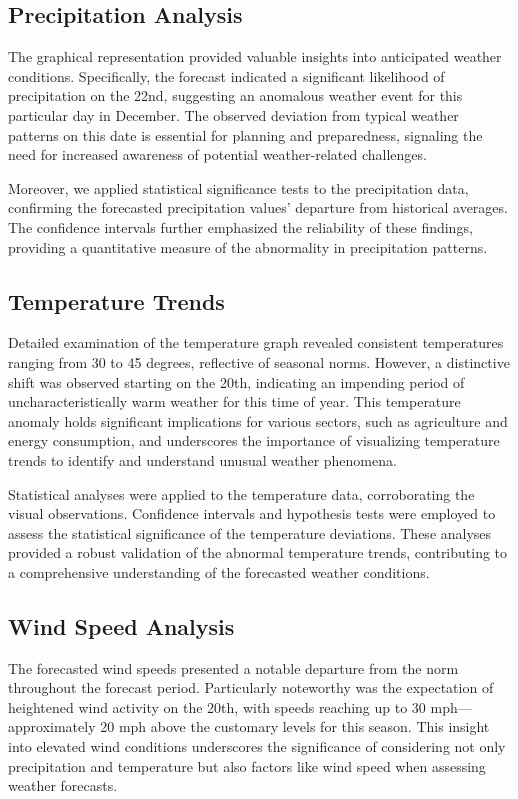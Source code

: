 \documentclass[conference]{IEEEtran}
\begin{document}
\subsection{Precipitation Analysis}

    The graphical representation provided valuable insights into anticipated weather conditions. Specifically, the forecast indicated a significant likelihood of precipitation on the 22nd, suggesting an anomalous weather event for this particular day in December. The observed deviation from typical weather patterns on this date is essential for planning and preparedness, signaling the need for increased awareness of potential weather-related challenges.

    Moreover, we applied statistical significance tests to the precipitation data, confirming the forecasted precipitation values' departure from historical averages. The confidence intervals further emphasized the reliability of these findings, providing a quantitative measure of the abnormality in precipitation patterns.

\subsection{Temperature Trends}

    Detailed examination of the temperature graph revealed consistent temperatures ranging from 30 to 45 degrees, reflective of seasonal norms. However, a distinctive shift was observed starting on the 20th, indicating an impending period of uncharacteristically warm weather for this time of year. This temperature anomaly holds significant implications for various sectors, such as agriculture and energy consumption, and underscores the importance of visualizing temperature trends to identify and understand unusual weather phenomena.

    Statistical analyses were applied to the temperature data, corroborating the visual observations. Confidence intervals and hypothesis tests were employed to assess the statistical significance of the temperature deviations. These analyses provided a robust validation of the abnormal temperature trends, contributing to a comprehensive understanding of the forecasted weather conditions.

\subsection{Wind Speed Analysis}

    The forecasted wind speeds presented a notable departure from the norm throughout the forecast period. Particularly noteworthy was the expectation of heightened wind activity on the 20th, with speeds reaching up to 30 mph—approximately 20 mph above the customary levels for this season. This insight into elevated wind conditions underscores the significance of considering not only precipitation and temperature but also factors like wind speed when assessing weather forecasts.
\end{document}
